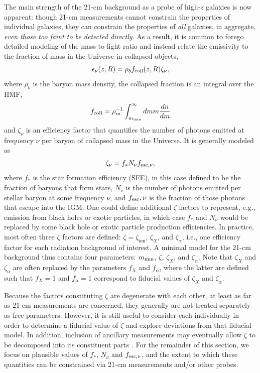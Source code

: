 The main strength of the 21-cm background as a probe of high-$z$ galaxies is now apparent: though 21-cm measurements cannot constrain the properties of individual galaxies, they can constrain the properties of \textit{all} galaxies, in aggregate, \textit{even those too faint to be detected directly}. As a result, it is common to forego detailed modeling of the mass-to-light ratio and instead relate the emissivity to the fraction of mass in the Universe in collapsed objects,
\begin{equation}
	\epsilon_{\nu}(z, R) = \rho_b f_{\text{coll}}(z, R) \zeta_{\nu} ,
\end{equation}
where $\rho_b$ is the baryon mass density, the collapsed fraction is an integral over the HMF,
\begin{equation}
	f_{\text{coll}} = \rho_m^{-1} \int_{m_{\text{min}}}^{\infty} dm m \frac{dn}{dm}
\end{equation}
and $\zeta_{\nu}$ is an efficiency factor that quantifies the number of photons emitted at frequency $\nu$ per baryon of collapsed mass in the Universe. It is generally modeled as
\begin{equation}
	\zeta_{\nu} = f_{\ast} N_{\nu} f_{\text{esc},\nu} , \label{eq:zeta}
\end{equation}
where $f_{\ast}$ is the star formation efficiency (SFE), in this case defined to be the fraction of baryons that form stars, $N_{\nu}$ is the number of photons emitted per stellar baryon at some frequency $\nu$, and $f_{\text{esc}},\nu$ is the fraction of those photons that escape into the IGM. One could define additional $\zeta$ factors to represent, e.g., emission from black holes or exotic particles, in which case $f_{\ast}$ and $N_{\nu}$ would be replaced by some black hole or exotic particle production efficiencies. In practice, most often three $\zeta$ factors are defined: $\zeta=\zeta_{\mathrm{ion}}$, $\zeta_X$, and $\zeta_{\alpha}$, i.e., one efficiency factor for each radiation background of interest. A minimal model for the 21-cm background thus contains four parameters: $m_{\text{min}}$, $\zeta$, $\zeta_X$, and $\zeta_{\alpha}$. Note that  $\zeta_X$ and $\zeta_{\alpha}$ are often replaced by the parameters $f_X$ and $f_{\alpha}$, where the latter are defined such that $f_X=1$ and $f_{\alpha}=1$ correspond to fiducial values of $\zeta_X$ and $\zeta_{\alpha}$.

Because the factors constituting $\zeta$ are degenerate with each other, at least as far as 21-cm measurements are concerned, they generally are not treated separately as free parameters. However, it is still useful to consider each individually in order to determine a fiducial value of $\zeta$ and explore deviations from that fiducial model. In addition, inclusion of ancillary measurements may eventually allow $\zeta$ to be decomposed into its constituent parts \cite{Mirocha2017,Park2019,Greig2019}. For the remainder of this section, we focus on plausible values of $f_{\ast}$, $N_{\nu}$ and $f_{\text{esc},\nu}$, and the extent to which these quantities can be constrained via 21-cm measurements and/or other probes. 

